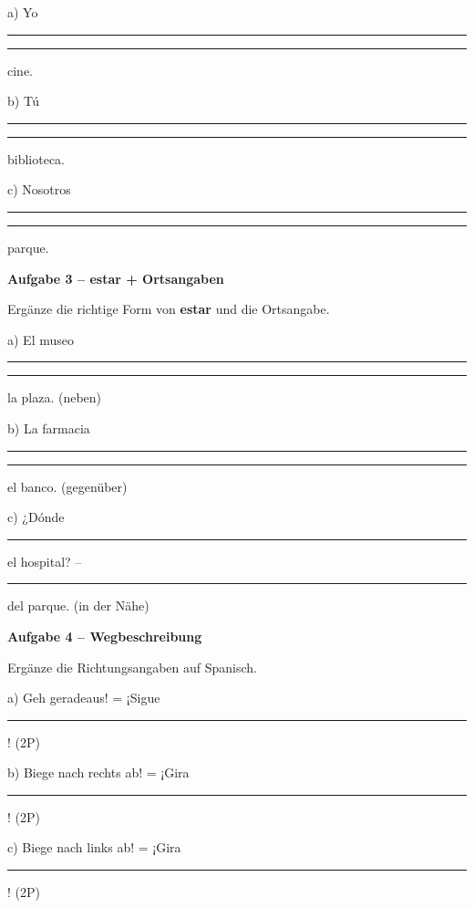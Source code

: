 \documentclass[11pt, a4paper]{article}
\newcommand{\fachfarbe}{spanisch}
\newcommand{\punktebox}[1]{\hfill\fbox{\small \_\_\_/#1}}
\newcommand{\luecke}[1]{\rule{#1}{0.4pt}}
\newenvironment{aufgabe}[1]{%
    \needspace{5\baselineskip}%
    \nopagebreak[4]%
    \vspace{10pt}
    \noindent\textbf{\textcolor{\fachfarbe}{Aufgabe #1}}
    \nopagebreak[4]%
    \vspace{5pt}
    \nopagebreak[4]%
    \begin{list}{}{\leftmargin=0pt}
    \item[]
}{%
    \end{list}
}
\newcommand{\es}[1]{\textcolor{\fachfarbe}{\textbf{#1}}}
\begin{document}
\noindent
a) Yo \luecke{2cm} \luecke{2cm} cine.

\vspace{0.8em}

\noindent
b) Tú \luecke{2cm} \luecke{2cm} biblioteca.

\vspace{0.8em}

\noindent
c) Nosotros \luecke{2cm} \luecke{2cm} parque.

\vspace{15pt}


\begin{aufgabe}{3 -- estar + Ortsangaben}
Ergänze die richtige Form von \es{estar} und die Ortsangabe. \punktebox{6}
\end{aufgabe}

\noindent
a) El museo \luecke{2.5cm} \luecke{3cm} la plaza. (neben)

\vspace{0.8em}

\noindent
b) La farmacia \luecke{2.5cm} \luecke{3cm} el banco. (gegenüber)

\vspace{0.8em}

\noindent
c) ¿Dónde \luecke{2.5cm} el hospital? -- \luecke{3cm} del parque. (in der Nähe)

\vspace{15pt}


\begin{aufgabe}{4 -- Wegbeschreibung}
Ergänze die Richtungsangaben auf Spanisch. \punktebox{6}
\end{aufgabe}

\noindent
a) Geh geradeaus! = ¡Sigue \luecke{4cm}! \hfill (2P)

\vspace{0.8em}

\noindent
b) Biege nach rechts ab! = ¡Gira \luecke{4cm}! \hfill (2P)

\vspace{0.8em}

\noindent
c) Biege nach links ab! = ¡Gira \luecke{4cm}! \hfill (2P)
\end{document}
